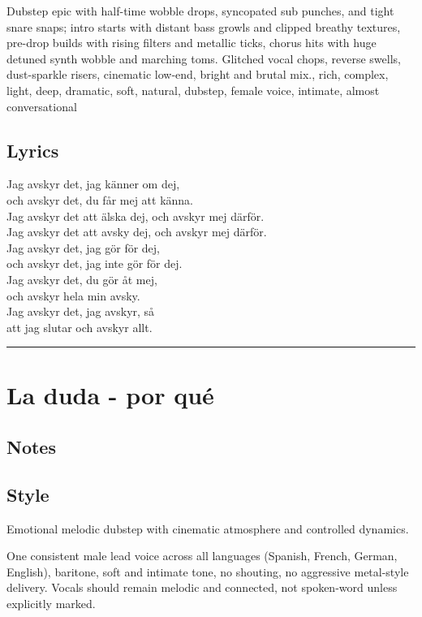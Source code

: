 Dubstep epic with half-time wobble drops, syncopated sub punches, and
tight snare snaps; intro starts with distant bass growls and clipped
breathy textures, pre-drop builds with rising filters and metallic
ticks, chorus hits with huge detuned synth wobble and marching toms.
Glitched vocal chops, reverse swells, dust-sparkle risers, cinematic
low-end, bright and brutal mix., rich, complex, light, deep, dramatic,
soft, natural, dubstep, female voice, intimate, almost conversational

\subsection{Lyrics}\label{lyrics-27}

Jag avskyr det, jag känner om dej,\\
och avskyr det, du får mej att känna.\\
Jag avskyr det att älska dej, och avskyr mej därför.\\
Jag avskyr det att avsky dej, och avskyr mej därför.\\
Jag avskyr det, jag gör för dej,\\
och avskyr det, jag inte gör för dej.\\
Jag avskyr det, du gör åt mej,\\
och avskyr hela min avsky.\\
Jag avskyr det, jag avskyr, så\\
att jag slutar och avskyr allt.

\begin{center}\rule{0.5\linewidth}{0.5pt}\end{center}

\section{La duda - por qué}\label{la-duda---por-quuxe9}

\subsection{Notes}\label{notes-29}

\subsection{Style}\label{style-28}

Emotional melodic dubstep with cinematic atmosphere and controlled
dynamics.

One consistent male lead voice across all languages (Spanish, French,
German, English), baritone, soft and intimate tone, no shouting, no
aggressive metal-style delivery. Vocals should remain melodic and
connected, not spoken-word unless explicitly marked.

